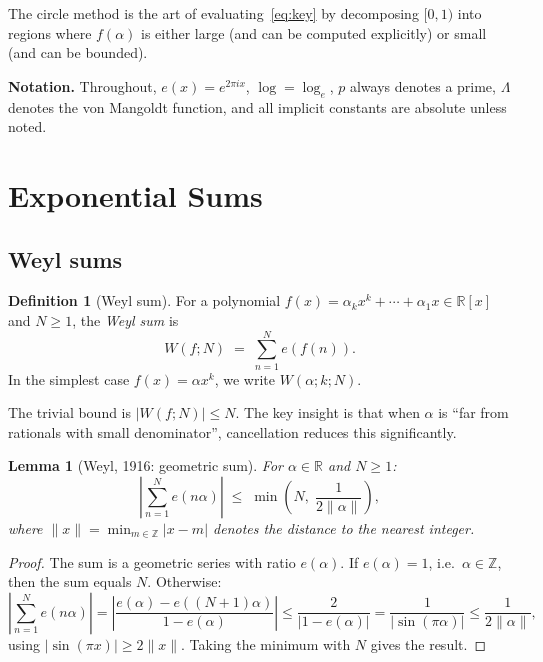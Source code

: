 \documentclass[12pt,a4paper]{amsart}
\newtheorem{lemma}[theorem]{Lemma}
\theoremstyle{definition}
\newtheorem{definition}[theorem]{Definition}
\newcommand{\Z}{\mathbb{Z}}
\newcommand{\R}{\mathbb{R}}
\newcommand{\eq}[1]{e\!\left(#1\right)}
\begin{document}
The circle method is the art of evaluating~\eqref{eq:key} by
decomposing $[0,1)$ into regions where $f(\alpha)$ is either large
(and can be computed explicitly) or small (and can be bounded).

\textbf{Notation.}  Throughout, $\eq{x} = e^{2\pi ix}$, $\log = \log_e$,
$p$ always denotes a prime, $\Lambda$ denotes the von Mangoldt function,
and all implicit constants are absolute unless noted.

\section{Exponential Sums}
\label{sec:expsums}

\subsection{Weyl sums}

\begin{definition}[Weyl sum]
  For a polynomial $f(x) = \alpha_k x^k + \cdots + \alpha_1 x \in \R[x]$
  and $N \geq 1$, the \emph{Weyl sum} is
  \[
    W(f; N) \;=\; \sum_{n=1}^{N} \eq{f(n)}.
  \]
  In the simplest case $f(x) = \alpha x^k$, we write $W(\alpha; k; N)$.
\end{definition}

The trivial bound is $|W(f; N)| \leq N$.  The key insight is that when
$\alpha$ is ``far from rationals with small denominator'', cancellation
reduces this significantly.

\begin{lemma}[Weyl, 1916: geometric sum]\label{lem:geom}
  For $\alpha \in \R$ and $N \geq 1$:
  \[
    \left|\sum_{n=1}^{N} \eq{n\alpha}\right|
    \;\leq\; \min\!\left(N,\; \frac{1}{2\|\alpha\|}\right),
  \]
  where $\|x\| = \min_{m \in \Z} |x - m|$ denotes the distance to the
  nearest integer.
\end{lemma}

\begin{proof}
  The sum is a geometric series with ratio $\eq{\alpha}$.  If
  $\eq{\alpha} = 1$, i.e.\ $\alpha \in \Z$, then the sum equals $N$.
  Otherwise:
  \[
    \left|\sum_{n=1}^N \eq{n\alpha}\right|
    = \left|\frac{\eq{\alpha} - \eq{(N+1)\alpha}}{1 - \eq{\alpha}}\right|
    \leq \frac{2}{|1 - \eq{\alpha}|}
    = \frac{1}{|\sin(\pi\alpha)|}
    \leq \frac{1}{2\|\alpha\|},
  \]
  using $|\sin(\pi x)| \geq 2\|x\|$.  Taking the minimum with $N$ gives
  the result.
\end{proof}
\end{document}
